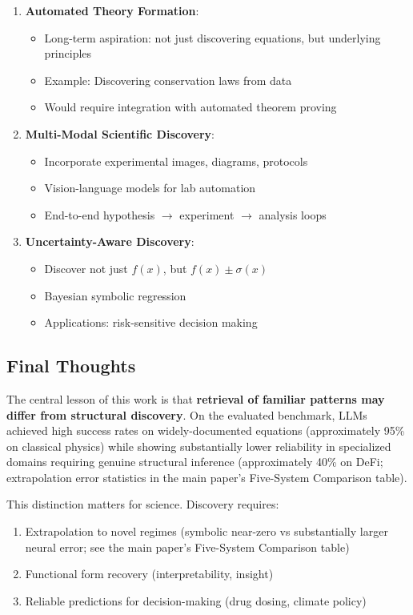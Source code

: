 \documentclass[twoside,11pt]{article}
\begin{document}
\begin{enumerate}
\item \textbf{Automated Theory Formation}:
   \begin{itemize}
   \item Long-term aspiration: not just discovering equations, but underlying principles
   \item Example: Discovering conservation laws from data
   \item Would require integration with automated theorem proving
   \end{itemize}

\item \textbf{Multi-Modal Scientific Discovery}:
   \begin{itemize}
   \item Incorporate experimental images, diagrams, protocols
   \item Vision-language models for lab automation
   \item End-to-end hypothesis $\to$ experiment $\to$ analysis loops
   \end{itemize}

\item \textbf{Uncertainty-Aware Discovery}:
   \begin{itemize}
   \item Discover not just $f(x)$, but $f(x) \pm \sigma(x)$
   \item Bayesian symbolic regression
   \item Applications: risk-sensitive decision making
   \end{itemize}
\end{enumerate}

\subsection{Final Thoughts}

The central lesson of this work is that \textbf{retrieval of familiar patterns may differ from structural discovery}\citep{kambhampati2024llms}. On the evaluated benchmark, LLMs achieved high success rates on widely-documented equations (approximately 95\% on classical physics) while showing substantially lower reliability in specialized domains requiring genuine structural inference (approximately 40\% on DeFi; extrapolation error statistics in the main paper's Five-System Comparison table).

This distinction matters for science. Discovery requires:
\begin{enumerate}
\item Extrapolation to novel regimes (symbolic near-zero vs substantially larger neural error; see the main paper's Five-System Comparison table)
\item Functional form recovery (interpretability, insight)
\item Reliable predictions for decision-making (drug dosing, climate policy)
\end{enumerate}
\end{document}

